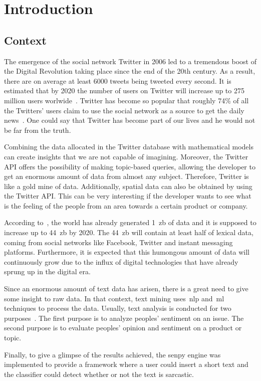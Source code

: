\chapter{Introduction}

\section{Context}
The emergence of the social network Twitter in 2006 led to a tremendous boost of the Digital Revolution taking place since the end of the 20th century. As a result, there are on average at least 6000 tweets being tweeted every second. It is estimated that by 2020 the number of users on Twitter will increase up to 275 million users worlwide~\cite{twitter1}. Twitter has become so popular that roughly 74\% of all the Twitters' users claim to use the social network as a source to get the daily news~\cite{twitter2}. One could say that Twitter has become part of our lives and he would not be far from the truth.\par

 Combining the data allocated in the Twitter database with mathematical models can create insights that we are not capable of imagining. Moreover, the Twitter API offers the possibility of making topic-based queries, allowing the developer to get an enormous amount of data from almost any subject. Therefore, Twitter is like a gold mine of data. Additionally, spatial data can also be obtained by using the Twitter API. This can be very interesting if the developer wants to see what is the feeling of the people from an area towards a certain product or company. \par
According to~\cite{shayaa2018sentiment}, the world has already generated 1~\ac{zb} of data and it is supposed to increase up to 44~\ac{zb} by 2020. The 44~\ac{zb} will contain at least half of lexical data, coming from social networks like Facebook, Twitter and instant messaging platforms. Furthermore, it is expected that this humongous amount of data will continuously grow due to the influx of digital technologies that have already sprung up in the digital era.\par
Since an enormous amount of text data has arisen, there is a great need to give some insight to raw data. In that context, text mining uses~\ac{nlp} and~\ac{ml} techniques to process the data. Usually, text analysis is conducted for two purposes~\cite{shayaa2018sentiment}. The first purpose is to analyze peoples' sentiment on an issue. The second purpose is to evaluate peoples' opinion and sentiment on a product or topic.\par
Finally, to give a glimpse of the results achieved, the senpy engine was implemented to provide a framework where a user could insert a short text and the classifier could detect whether or not the text is sarcastic.
